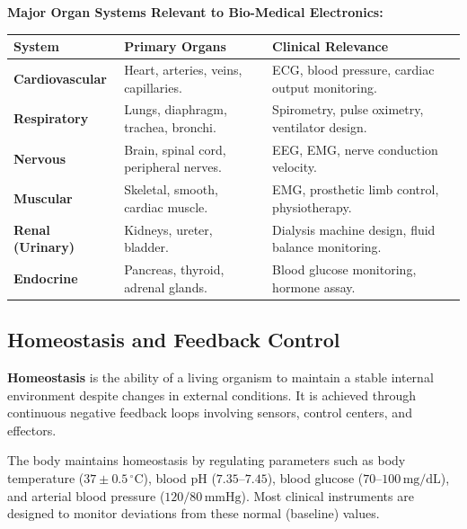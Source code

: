 \documentclass[12pt,a4paper]{article}
\begin{document}
\textbf{Major Organ Systems Relevant to Bio-Medical Electronics:}\par\noindent
\begin{tabularx}{\linewidth}{|B{3.2cm}|Y|Y|}
\hline
\textbf{System} & \textbf{\color{myteal}Primary Organs} & \textbf{\color{mygreen}Clinical Relevance} \\
\hline
\textbf{Cardiovascular} & Heart, arteries, veins, capillaries. & ECG, blood pressure, cardiac output monitoring. \\
\hline
\textbf{Respiratory} & Lungs, diaphragm, trachea, bronchi. & Spirometry, pulse oximetry, ventilator design. \\
\hline
\textbf{Nervous} & Brain, spinal cord, peripheral nerves. & EEG, EMG, nerve conduction velocity. \\
\hline
\textbf{Muscular} & Skeletal, smooth, cardiac muscle. & EMG, prosthetic limb control, physiotherapy. \\
\hline
\textbf{Renal (Urinary)} & Kidneys, ureter, bladder. & Dialysis machine design, fluid balance monitoring. \\
\hline
\textbf{Endocrine} & Pancreas, thyroid, adrenal glands. & Blood glucose monitoring, hormone assay. \\
\hline
\end{tabularx}

\subsection{Homeostasis and Feedback Control}

\begin{tcolorbox}[defbox, title={\textbf{Definition: Homeostasis}}]
\textbf{Homeostasis} is the ability of a living organism to maintain a stable internal environment despite changes in external conditions. It is achieved through continuous negative feedback loops involving sensors, control centers, and effectors.
\end{tcolorbox}

The body maintains homeostasis by regulating parameters such as body temperature ($37\pm0.5\,^{\circ}\text{C}$), blood pH ($7.35$--$7.45$), blood glucose ($70$--$100\,\text{mg/dL}$), and arterial blood pressure ($120/80\,\text{mmHg}$). Most clinical instruments are designed to monitor deviations from these normal (baseline) values.
\end{document}
